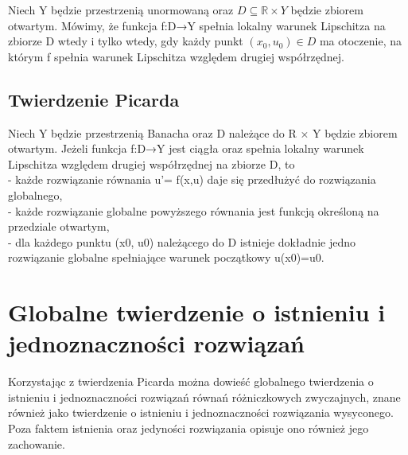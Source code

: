 \documentclass{article}
\begin{document}
Niech Y będzie przestrzenią unormowaną oraz  $D\subseteq \mathbb {R} \times Y$ będzie zbiorem otwartym. Mówimy, że funkcja f:D→Y spełnia lokalny warunek Lipschitza na zbiorze D wtedy i tylko wtedy, gdy każdy punkt \((x_{0},u_{0})\in D\) ma otoczenie, na którym f spełnia warunek Lipschitza względem drugiej współrzędnej.

\subsection*{Twierdzenie Picarda}

Niech Y będzie przestrzenią Banacha oraz D należące do R × Y będzie zbiorem otwartym. Jeżeli funkcja f:D→Y jest ciągła oraz spełnia lokalny warunek Lipschitza względem drugiej współrzędnej na zbiorze D, to\\
- każde rozwiązanie równania u'= f(x,u) daje się przedłużyć do rozwiązania globalnego, \\
- każde rozwiązanie globalne powyższego równania jest funkcją określoną na przedziale otwartym, \\
- dla każdego punktu (x0, u0) należącego do D istnieje dokładnie jedno rozwiązanie globalne spełniające warunek początkowy u(x0)=u0.



\section*{Globalne twierdzenie o istnieniu i jednoznaczności rozwiązań}

Korzystając z twierdzenia Picarda można dowieść globalnego twierdzenia o istnieniu i jednoznaczności rozwiązań równań różniczkowych zwyczajnych, znane również jako twierdzenie o istnieniu i jednoznaczności rozwiązania wysyconego. Poza faktem istnienia oraz jedyności rozwiązania opisuje ono również jego zachowanie. 
\end{document}
